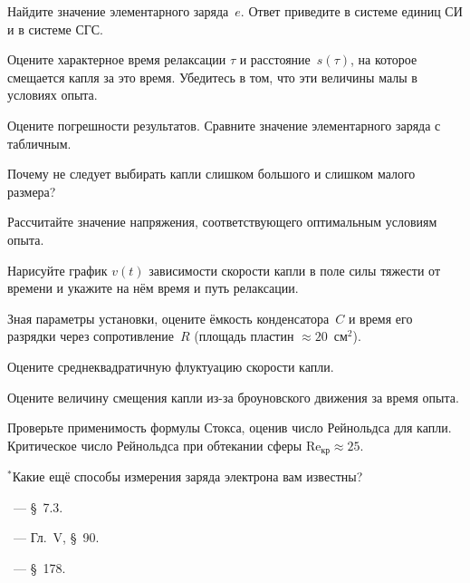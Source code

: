 \begin{lab:task}
\item Найдите значение элементарного заряда~$e$. 
Ответ приведите в системе единиц СИ и в системе СГС.

\item Оцените характерное время релаксации $\tau$ и расстояние~$s(\tau)$, 
на которое смещается капля за это время. Убедитесь в том, что эти величины
малы в условиях опыта.

\item Оцените погрешности результатов. Сравните значение элементарного заряда
с табличным.

\end{lab:task}


\begin{lab:questions}
\item Почему не следует выбирать капли слишком большого и слишком малого
размера?

\item Рассчитайте значение напряжения, соответствующего оптимальным условиям опыта.

\item Нарисуйте график $v(t)$ зависимости скорости капли в поле силы 
тяжести от времени и укажите на нём время и путь релаксации.

\item Зная параметры установки, оцените ёмкость конденсатора~$C$ и время его
разрядки через сопротивление~$R$ (площадь пластин $\approx 20$~см$^2$).

\item Оцените среднеквадратичную флуктуацию скорости капли.

\item Оцените величину смещения капли из-за броуновского движения за время опыта.

\item Проверьте применимость формулы Стокса, оценив число Рейнольдса для капли.
Критическое число Рейнольдса при обтекании сферы $\mathrm{Re}_{кр} \approx 25$.

\item $^*$Какие ещё способы измерения заряда электрона вам известны?
\end{lab:questions}


\begin{lab:literature}
    \item \Kirichenko~--- \S~7.3.
\item \SivuhinIII~--- Гл.~V, \S~90.
\item \Kalashnikov~--- \S~178.
\end{lab:literature}
